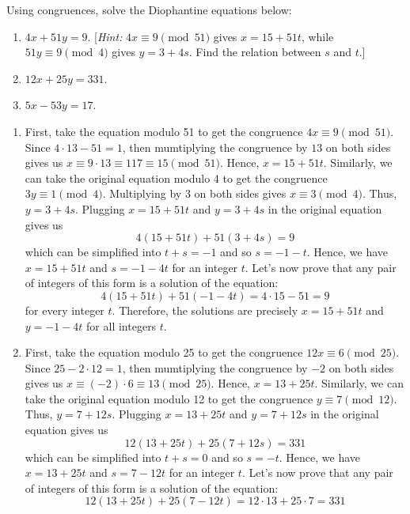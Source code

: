 \begin{exercise}
    Using congruences, solve the Diophantine equations below:
    \begin{enumerate}
        \item $4x + 51y = 9$. [\textit{Hint:} $4x \equiv 9 \pmod{51}$ gives $x = 15 + 51t$, while $51y \equiv 9 \pmod{4}$ gives $y = 3 + 4s$. Find the relation between $s$ and $t$.]
        \item $12x + 25y = 331$.
        \item $5x - 53y = 17$.
    \end{enumerate}
\end{exercise}

\begin{solution}
    \begin{enumerate}
        \item First, take the equation modulo 51 to get the congruence $4x \equiv 9 \pmod{51}$. Since $4 \cdot 13 - 51 = 1$, then mumtiplying the congruence by $13$ on both sides gives us $x \equiv 9 \cdot 13 \equiv 117 \equiv 15 \pmod{51}$. Hence, $x = 15 + 51t$. Similarly, we can take the original equation modulo 4 to get the congruence $3y \equiv 1 \pmod{4}$. Multiplying by 3 on both sides gives $x \equiv 3 \pmod{4}$. Thus, $y = 3 + 4s$. Plugging $x = 15 + 51t$ and $y = 3 + 4s$ in the original equation gives us 
        $$4(15 + 51t) + 51(3 + 4s) = 9$$
        which can be simplified into $t + s = -1$ and so $s = -1 - t$. Hence, we have $x = 15 + 51t$ and $s = -1 - 4t$ for an integer $t$. Let's now prove that any pair of integers of this form is a solution of the equation:
        $$4(15 + 51t) + 51(-1-4t) = 4 \cdot 15 -51 = 9$$
        for every integer $t$. Therefore, the solutions are precisely $x = 15 + 51t$ and $y = -1 - 4t$ for all integers $t$.
        \item First, take the equation modulo 25 to get the congruence $12x \equiv 6 \pmod{25}$. Since $25 - 2 \cdot 12 = 1$, then mumtiplying the congruence by $-2$ on both sides gives us $x \equiv (-2) \cdot 6 \equiv 13 \pmod{25}$. Hence, $x = 13 + 25t$. Similarly, we can take the original equation modulo 12 to get the congruence $y \equiv 7 \pmod{12}$. Thus, $y = 7 + 12s$. Plugging $x = 13 + 25t$ and $y = 7 + 12s$ in the original equation gives us 
        $$12(13 + 25t) + 25(7 + 12s) = 331$$
        which can be simplified into $t + s = 0$ and so $s =- t$. Hence, we have $x = 13 + 25t$ and $s = 7 - 12t$ for an integer $t$. Let's now prove that any pair of integers of this form is a solution of the equation:
        $$12(13 + 25t) + 25(7-12t) = 12 \cdot 13 + 25 \cdot 7 = 331$$

\end{enumerate}
\end{solution}
